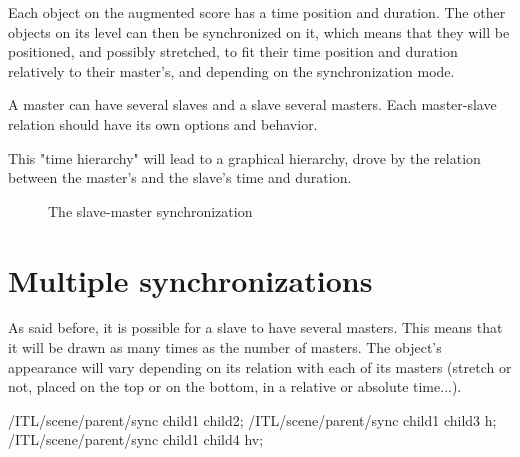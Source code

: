 \documentclass[a4paper]{article}
\newenvironment{inscore}	{\vspace{-2mm}\small\verbatim}{\endverbatim\vspace{-2mm}}
\begin{document}
Each object on the augmented score has a time position and duration. The other objects on its level can then be synchronized on it, which means that they will be positioned, and possibly stretched, to fit their time position and duration relatively to their master's, and depending on the synchronization mode.

A master can have several slaves and a slave several masters. Each master-slave relation should have its own options and behavior.

This "time hierarchy" will lead to a graphical hierarchy, drove by the relation between the master's and the slave's time and duration.

\begin{figure}[h]


 \caption{The slave-master synchronization}
 \label{fig:sync}

\end{figure}


\section{Multiple synchronizations}\label{sec:multSync}

As said before, it is possible for a slave to have several masters. This means that it will be drawn as many times as the number of masters. The object's appearance will vary depending on its relation with each of its masters (stretch or not, placed on the top or on the bottom, in a relative or absolute time...).

\begin{inscore}
/ITL/scene/parent/sync child1 child2;
/ITL/scene/parent/sync child1 child3 h;
/ITL/scene/parent/sync child1 child4 hv;
\end{inscore}
\end{document}

